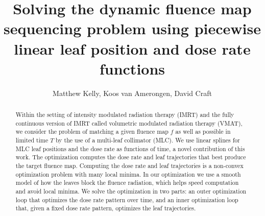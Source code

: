 \documentclass[12pt]{article}
\title{Solving the dynamic fluence map sequencing problem using piecewise linear leaf position and dose rate functions}
\author{Matthew Kelly, Koos van Amerongen, David Craft}
\affil[]{Department of Radiation Oncology, Massachusetts General Hospital, Harvard Medical School}
\begin{document}
\maketitle
\thispagestyle{empty}

\begin{abstract}
  Within the setting of intensity modulated radiation therapy (IMRT) and the fully continuous version of IMRT called
  volumetric modulated radiation therapy (VMAT), we consider the problem of matching a given fluence map $f$ as well as possible in
  limited time $T$ by the use of a multi-leaf collimator (MLC).
  We use linear splines for MLC leaf positions and the dose rate as functions of time, a novel contribution of this work.
  The optimization computes the dose rate and leaf trajectories that best produce
  the target fluence map.
  Computing the dose rate and leaf trajectories is a non-convex optimization problem
  with many local minima.
  In our optimization we use a smooth model of how the leaves block the fluence radiation,
  which helps speed computation and avoid local minima.
  We solve the optimization in two parts:
  an outer optimization loop that optimizes the dose rate pattern over time, and
  an inner optimization loop that, given a fixed dose rate pattern, optimizes the leaf trajectories.
\end{abstract}
\end{document}

